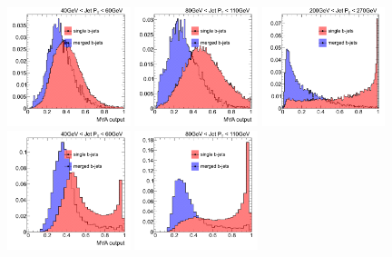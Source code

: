 \begin{figure}[tp]
\centering
\includegraphics[width=0.32\textwidth]{FIGS/TEMPFigs/MVA_differentMethods/inclusive/NNoutput040_LihoodKDE.pdf}
\includegraphics[width=0.32\textwidth]{FIGS/TEMPFigs/MVA_differentMethods/inclusive/NNoutput080_LihoodKDE.pdf}
\includegraphics[width=0.32\textwidth]{FIGS/TEMPFigs/MVA_differentMethods/inclusive/NNoutput200_LihoodKDE.pdf}
\includegraphics[width=0.32\textwidth]{FIGS/TEMPFigs/MVA_differentMethods/inclusive/NNoutput040_MLP.pdf}
\includegraphics[width=0.32\textwidth]{FIGS/TEMPFigs/MVA_differentMethods/inclusive/NNoutput080_MLP.pdf}

\end{figure}
